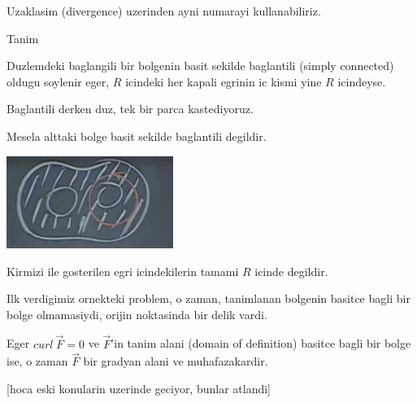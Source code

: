 \documentclass[12pt,fleqn]{article}\usepackage{../common}
\begin{document}
Uzaklasim (divergence) uzerinden ayni numarayi kullanabiliriz. 

Tanim 

Duzlemdeki baglangili bir bolgenin basit sekilde baglantili (simply
connected) oldugu soylenir eger, $R$ icindeki her kapali egrinin ic kismi
yine $R$ icindeyse. 

Baglantili derken duz, tek bir parca kastediyoruz.

Mesela alttaki bolge basit sekilde baglantili degildir. 

\includegraphics[height=3cm]{24_7.png}

Kirmizi ile gosterilen egri icindekilerin tamami $R$ icinde degildir. 

Ilk verdigimiz ornekteki problem, o zaman, tanimlanan bolgenin basitce
bagli bir bolge olmamasiydi, orijin noktasinda bir delik vardi. 

Eger $curl \ \vec{F} = 0$ ve $\vec{F}$'in tanim alani (domain of definition) basitce bagli 
bir bolge ise, o zaman $\vec{F}$ bir gradyan alani ve muhafazakardir. 

[hoca eski konularin uzerinde geciyor, bunlar atlandi]
\end{document}
